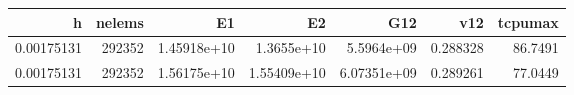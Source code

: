 \begin{tabular}{rrrrrrr}
h & nelems & E1 & E2 & G12 & v12 & tcpumax \\
\hline
0.00175131 & 292352 & 1.45918e+10 & 1.3655e+10 & 5.5964e+09 & 0.288328 & 86.7491 \\
0.00175131 & 292352 & 1.56175e+10 & 1.55409e+10 & 6.07351e+09 & 0.289261 & 77.0449 \\
\end{tabular}